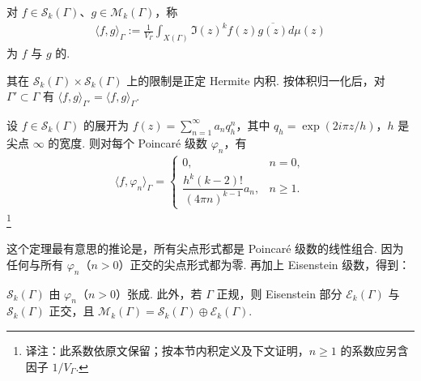\begin{definition*}
对 $f\in\mathcal S_k(\Gamma)$、$g\in\mathcal M_k(\Gamma)$，称
\begin{align*}
\langle f,g\rangle_\Gamma:=\frac{1}{V_\Gamma}\int_{X(\Gamma)}\Im(z)^kf(z)\overline{g(z)}d\mu(z)
\end{align*}
为 $f$ 与 $g$ 的.
\end{definition*}
其在 $\mathcal S_k(\Gamma)\times\mathcal S_k(\Gamma)$ 上的限制是正定 Hermite 内积. 按体积归一化后，对 $\Gamma'\subset\Gamma$ 有 $\langle f,g\rangle_{\Gamma'}=\langle f,g\rangle_\Gamma$.
\begin{theorem*}
设 $f\in\mathcal S_k(\Gamma)$ 的展开为 $f(z)=\sum_{n=1}^\infty a_nq_h^n$，其中 $q_h=\exp(2i\pi z/h)$，$h$ 是尖点 $\infty$ 的宽度. 则对每个 Poincaré 级数 $\varphi_n$，有
\begin{align*}
\langle f,\varphi_n\rangle_\Gamma=\begin{cases}0,&n=0,\\\dfrac{h^k(k-2)!}{(4\pi n)^{k-1}}a_n,&n\geqslant1.\end{cases}
\end{align*}
\footnote{译注：此系数依原文保留；按本节内积定义及下文证明，$n\geqslant1$ 的系数应另含因子 $1/V_\Gamma$.}
\end{theorem*}
这个定理最有意思的推论是，所有尖点形式都是 Poincaré 级数的线性组合. 因为任何与所有 $\varphi_n$（$n>0$）正交的尖点形式都为零. 再加上 Eisenstein 级数，得到：
\begin{corollary*}
$\mathcal S_k(\Gamma)$ 由 $\varphi_n$（$n>0$）张成. 此外，若 $\Gamma$ 正规，则 Eisenstein 部分 $\mathcal E_k(\Gamma)$ 与 $\mathcal S_k(\Gamma)$ 正交，且 $\mathcal M_k(\Gamma)=\mathcal S_k(\Gamma)\oplus\mathcal E_k(\Gamma)$.
\end{corollary*}
